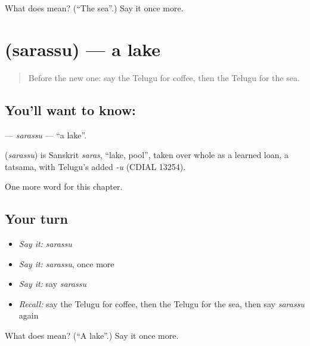 \begin{tcolorbox}[breakable,colback=teal!4,colframe=teal!35!black,title={Before you move on}]
What does  mean? (\textquotedblleft{}The sea\textquotedblright{}.) Say it once more.
\end{tcolorbox}
\section[\texorpdfstring{\te{సరస్సు} (sarassu)}{సరస్సు (sarassu)}]{ (sarassu) — a lake}

\label{lesson:TE-C120-sarassu}



\begin{quote}
Before the new one: say the Telugu for coffee, then the Telugu for the sea.
\end{quote}

\subsection*{You'll want to know: }
\textbf{} — \emph{sarassu} — \textquotedblleft{}a lake\textquotedblright{}.

\begin{cousinweb}
\textbf{} (\emph{sarassu}) is Sanskrit \emph{saras}, \textquotedblleft{}lake, pool\textquotedblright{}, taken over whole as a learned loan, a tatsama, with Telugu's added \emph{-u} (CDIAL 13254).
\end{cousinweb}

\begin{grammarlens}[title={What you've built}]
One more word for this chapter.
\end{grammarlens}

\subsection*{Your turn}
\begin{itemize}
\raggedright
  \item \emph{Say it:} \emph{sarassu}
  \item \emph{Say it:} \emph{sarassu}, once more
  \item \emph{Say it:} say \emph{sarassu}
  \item \emph{Recall:} say the Telugu for coffee, then the Telugu for the sea, then say \emph{sarassu} again
\end{itemize}

\begin{tcolorbox}[breakable,colback=teal!4,colframe=teal!35!black,title={Before you move on}]
What does  mean? (\textquotedblleft{}A lake\textquotedblright{}.) Say it once more.
\end{tcolorbox}
